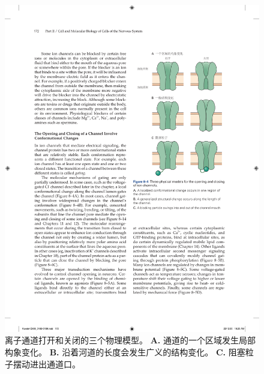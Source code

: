 \begin{figure}[htbp]
	\centering
	\includegraphics[width=0.55\linewidth]{chap08/fig_8_4}
	\caption{离子通道打开和关闭的三个物理模型。
		\textbf{A.} 通道的一个区域发生局部构象变化。
		\textbf{B.} 沿着河道的长度会发生广义的结构变化。
		\textbf{C.} 阻塞粒子摆动进出通道口。}
	\label{fig:8_4}
\end{figure}



